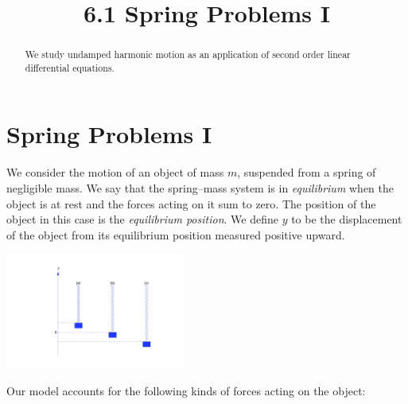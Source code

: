 \documentclass{ximera}
\title{6.1 Spring Problems I}
\begin{document}
 
\begin{abstract}
 We study undamped harmonic motion as an application of second order linear differential equations.
\end{abstract}
 
\maketitle
 
\section*{Spring Problems I}
 
 
We consider the motion of an object of mass $m$, suspended from a
spring of negligible mass. We say that the spring--mass system is
in \textit{equilibrium} when the object is at rest and the forces
acting on it sum to zero. The position of the object in this case is
the \textit{equilibrium position}. We define $y$ to be the displacement
of the object from its equilibrium position %
measured positive upward.
 
\begin{image}
  \includegraphics[height=1.5in]{fig060101.jpg}
\end{image}
 
Our model accounts for the following kinds of forces acting on the
object:
 
\end{document}
